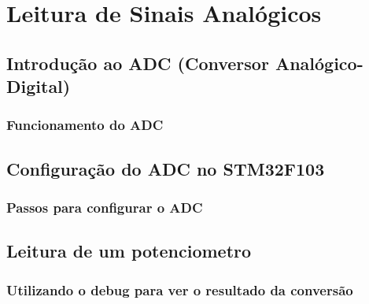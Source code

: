 \section{Leitura de Sinais Analógicos}

\subsection{Introdução ao ADC (Conversor Analógico-Digital)}
\subsubsection{Funcionamento do ADC}

\subsection{Configuração do ADC no STM32F103}
\subsubsection{Passos para configurar o ADC}

\subsection{Leitura de um potenciometro}
\subsubsection{Utilizando o debug para ver o resultado da conversão}
